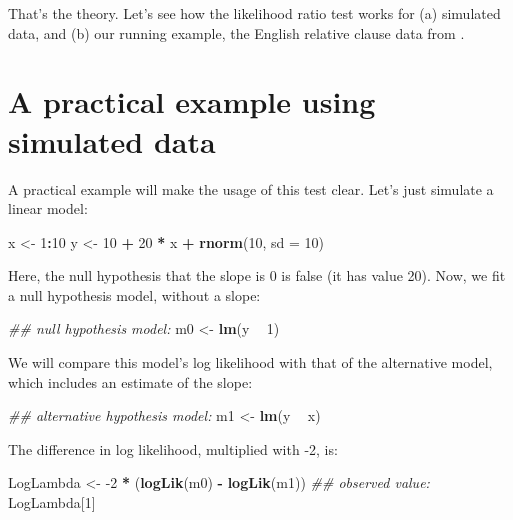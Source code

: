 \documentclass[12pt,]{krantz}
\newenvironment{Shaded}{\begin{snugshade}}{\end{snugshade}}
\newcommand{\CommentTok}[1]{\textcolor[rgb]{0.56,0.35,0.01}{\textit{#1}}}
\newcommand{\DataTypeTok}[1]{\textcolor[rgb]{0.13,0.29,0.53}{#1}}
\newcommand{\DecValTok}[1]{\textcolor[rgb]{0.00,0.00,0.81}{#1}}
\newcommand{\KeywordTok}[1]{\textcolor[rgb]{0.13,0.29,0.53}{\textbf{#1}}}
\newcommand{\NormalTok}[1]{#1}
\newcommand{\OperatorTok}[1]{\textcolor[rgb]{0.81,0.36,0.00}{\textbf{#1}}}
\newcommand{\StringTok}[1]{\textcolor[rgb]{0.31,0.60,0.02}{#1}}
\begin{document}
That's the theory. Let's see how the likelihood ratio test works for (a) simulated data, and (b) our running example, the English relative clause data from \citet{grodner}.

\hypertarget{a-practical-example-using-simulated-data}{%
\section{A practical example using simulated data}\label{a-practical-example-using-simulated-data}}

A practical example will make the usage of this test clear.
Let's just simulate a linear model:

\begin{Shaded}
\begin{Highlighting}[]
\NormalTok{x <-}\StringTok{ }\DecValTok{1}\OperatorTok{:}\DecValTok{10}
\NormalTok{y <-}\StringTok{ }\DecValTok{10} \OperatorTok{+}\StringTok{ }\DecValTok{20} \OperatorTok{*}\StringTok{ }\NormalTok{x }\OperatorTok{+}\StringTok{ }\KeywordTok{rnorm}\NormalTok{(}\DecValTok{10}\NormalTok{, }\DataTypeTok{sd =} \DecValTok{10}\NormalTok{)}
\end{Highlighting}
\end{Shaded}

Here, the null hypothesis that the slope is 0 is false (it has value 20). Now, we fit a null hypothesis model, without a slope:

\begin{Shaded}
\begin{Highlighting}[]
\CommentTok{## null hypothesis model:}
\NormalTok{m0 <-}\StringTok{ }\KeywordTok{lm}\NormalTok{(y }\OperatorTok{~}\StringTok{ }\DecValTok{1}\NormalTok{)}
\end{Highlighting}
\end{Shaded}

We will compare this model's log likelihood with that of the alternative model, which includes an estimate of the slope:

\begin{Shaded}
\begin{Highlighting}[]
\CommentTok{## alternative hypothesis model:}
\NormalTok{m1 <-}\StringTok{ }\KeywordTok{lm}\NormalTok{(y }\OperatorTok{~}\StringTok{ }\NormalTok{x)}
\end{Highlighting}
\end{Shaded}

The difference in log likelihood, multiplied with -2, is:

\begin{Shaded}
\begin{Highlighting}[]
\NormalTok{LogLambda <-}\StringTok{ }\DecValTok{-2} \OperatorTok{*}\StringTok{ }\NormalTok{(}\KeywordTok{logLik}\NormalTok{(m0) }\OperatorTok{-}\StringTok{ }\KeywordTok{logLik}\NormalTok{(m1))}
\CommentTok{## observed value:}
\NormalTok{LogLambda[}\DecValTok{1}\NormalTok{]}
\end{Highlighting}
\end{Shaded}
\end{document}
